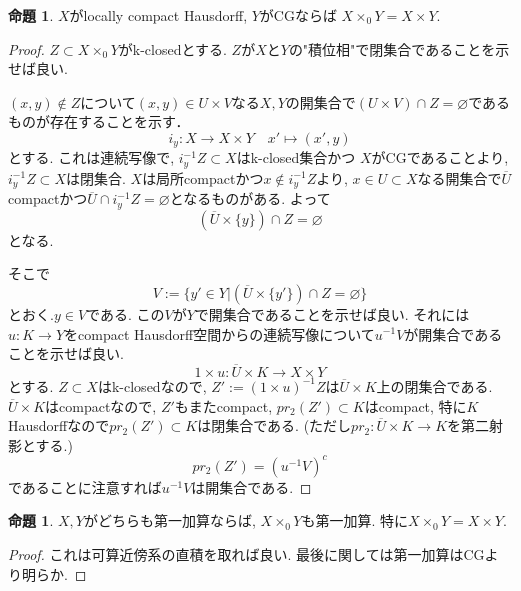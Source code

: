 \documentclass[dvipdfmx,a4paper,11pt]{article}
\theoremstyle{definition}
\newtheorem{prop}[thm]{命題}
\begin{document}
 \begin{tcolorbox}
 [colback = white, colframe = green!35!black, fonttitle = \bfseries,breakable = true]
\begin{prop}\cite[Prop2.6]{Str}
$X$がlocally compact Hausdorff, $Y$がCGならば
$X \times_0 Y = X \times Y$.
\end{prop}
\end{tcolorbox}
\begin{proof}
$Z \subset X \times_0 Y$がk-closedとする. 
$Z$が$X$と$Y$の"積位相"で閉集合であることを示せば良い.

$(x,y) \not \in Z$について$(x,y) \in U \times V$なる$X,Y$の開集合で$(U\times V) \cap Z =\varnothing$であるものが存在することを示す．
$$
i_y : X \to X \times Y \quad x' \mapsto (x',y)
$$
とする. これは連続写像で, $i_{y}^{-1}Z \subset X$はk-closed集合かつ
$X$がCGであることより, $i_{y}^{-1}Z \subset X$は閉集合.
$X$は局所compactかつ$x \not \in i_{y}^{-1}Z $より, $x \in U \subset X$なる開集合で$\overline{U}$compactかつ$\overline{U} \cap i_{y}^{-1}Z = \varnothing$となるものがある.
よって
$$
(\overline{U} \times \{ y\})\cap Z = \varnothing
$$
となる. 

そこで
$$
V:= \{ y' \in Y | (\overline{U} \times \{ y' \}) \cap Z = \varnothing\}
$$
とおく.$y \in V$である. この$V$が$Y$で開集合であることを示せば良い.
それには$u : K \to Y$をcompact Hausdorff空間からの連続写像について$u^{-1}V$が開集合であることを示せば良い.
$$
1 \times u : \overline{U} \times K \to X \times Y
$$
とする. 
$Z \subset X$はk-closedなので, 
$Z' := (1 \times u)^{-1}Z$は$\overline{U} \times K$上の閉集合である. 
$\overline{U} \times K$はcompactなので, $Z'$もまたcompact, 
$pr_2(Z') \subset K$はcompact, 特に$K$Hausdorffなので$pr_2(Z') \subset K$は閉集合である.
(ただし$pr_2 : \overline{U} \times K \to K$を第二射影とする.)
$$
pr_2(Z') = (u^{-1}V)^c
$$
であることに注意すれば$u^{-1}V$は開集合である. 
\end{proof}

 \begin{tcolorbox}
 [colback = white, colframe = green!35!black, fonttitle = \bfseries,breakable = true]
\begin{prop}\cite[Prop2.7]{Str}
$X,Y$がどちらも第一加算ならば, $X \times_0 Y$も第一加算.
特に$X \times_0 Y = X \times Y$.
\end{prop}
\end{tcolorbox}
\begin{proof}
これは可算近傍系の直積を取れば良い.
最後に関しては第一加算はCGより明らか. 
\end{proof}
\end{document}
